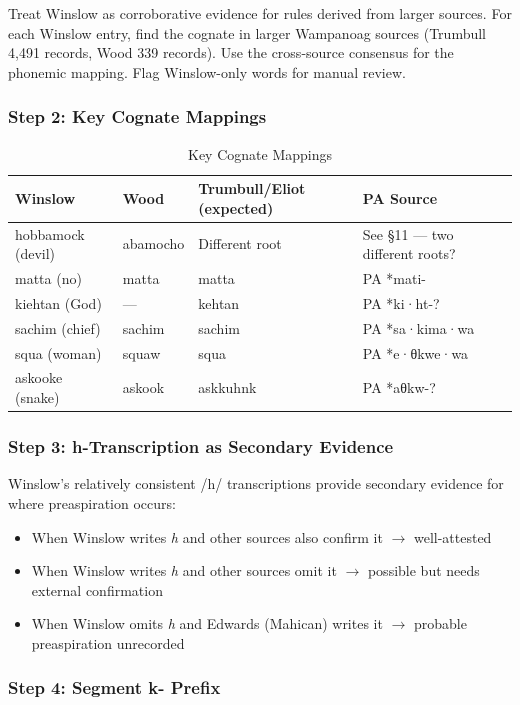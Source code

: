 Treat Winslow as corroborative evidence for rules derived from larger sources.
For each Winslow entry, find the cognate in larger Wampanoag sources (Trumbull
4,491 records, Wood 339 records). Use the cross-source consensus for the
phonemic mapping. Flag Winslow-only words for manual review.

\subsubsection{Step 2: Key Cognate Mappings}

\begin{table}[htbp]
\centering
\caption{Key Cognate Mappings}
\label{tab:1366-key-cognates}
\begin{tabular}{llll}
\hline
Winslow & Wood & Trumbull/Eliot (expected) & PA Source \\
\hline
hobbamock (devil) & abamocho & Different root & See §11 --- two different roots? \\
matta (no) & matta & matta & PA *mati- \\
kiehtan (God) & --- & kehtan & PA *ki·ht-? \\
sachim (chief) & sachim & sachim & PA *sa·kima·wa \\
squa (woman) & squaw & squa & PA *e·θkwe·wa \\
askooke (snake) & askook & askkuhnk & PA *aθkw-? \\
\hline
\end{tabular}
\end{table}

\subsubsection{Step 3: h-Transcription as Secondary Evidence}

Winslow's relatively consistent /h/ transcriptions provide secondary evidence
for where preaspiration occurs:
\begin{itemize}
  \item When Winslow writes \emph{h} and other sources also confirm it
    $\rightarrow$ well-attested
  \item When Winslow writes \emph{h} and other sources omit it $\rightarrow$
    possible but needs external confirmation
  \item When Winslow omits \emph{h} and Edwards (Mahican) writes it
    $\rightarrow$ probable preaspiration unrecorded
\end{itemize}

\subsubsection{Step 4: Segment k- Prefix}

